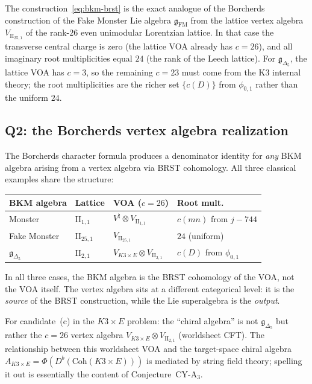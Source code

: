 \begin{remark}
\label{rem:k3e-fake-monster-comparison}
The construction~\eqref{eq:bkm-brst} is the exact analogue of the Borcherds construction of the Fake Monster Lie algebra $\mathfrak{g}_{\mathrm{FM}}$ from the lattice vertex algebra $V_{\mathrm{II}_{25,1}}$ of the rank-$26$ even unimodular Lorentzian lattice. In that case the transverse central charge is zero (the lattice VOA already has $c = 26$), and all imaginary root multiplicities equal $24$ (the rank of the Leech lattice). For $\mathfrak{g}_{\Delta_5}$, the lattice VOA has $c = 3$, so the remaining $c = 23$ must come from the K3 internal theory; the root multiplicities are the richer set $\{c(D)\}$ from $\phi_{0,1}$ rather than the uniform $24$.
\end{remark}

\subsection{Q2: the Borcherds vertex algebra realization}
\label{subsec:k3e-bkm-q2}

The Borcherds character formula produces a denominator identity for \emph{any} BKM algebra arising from a vertex algebra via BRST cohomology. All three classical examples share the structure:
\begin{center}
\renewcommand{\arraystretch}{1.3}
\begin{tabular}{@{}llll@{}}
\textbf{BKM algebra} & \textbf{Lattice} & \textbf{VOA ($c = 26$)} & \textbf{Root mult.} \\ \hline
Monster & $\mathrm{II}_{1,1}$ & $V^\natural \otimes V_{\mathrm{II}_{1,1}}$ & $c(mn)$ from $j - 744$ \\
Fake Monster & $\mathrm{II}_{25,1}$ & $V_{\mathrm{II}_{25,1}}$ & $24$ (uniform) \\
$\mathfrak{g}_{\Delta_5}$ & $\mathrm{II}_{2,1}$ & $V_{K3 \times E} \otimes V_{\mathrm{II}_{2,1}}$ & $c(D)$ from $\phi_{0,1}$
\end{tabular}
\end{center}
In all three cases, the BKM algebra is the BRST cohomology of the VOA, not the VOA itself. The vertex algebra sits at a different categorical level: it is the \emph{source} of the BRST construction, while the Lie superalgebra is the \emph{output}.

For candidate~(c) in the $K3 \times E$ problem: the ``chiral algebra'' is not $\mathfrak{g}_{\Delta_5}$ but rather the $c = 26$ vertex algebra $V_{K3 \times E} \otimes V_{\mathrm{II}_{2,1}}$ (worldsheet CFT). The relationship between this worldsheet VOA and the target-space chiral algebra $A_{K3 \times E} = \Phi(D^b(\mathrm{Coh}(K3 \times E)))$ is mediated by string field theory; spelling it out is essentially the content of Conjecture~CY-A$_3$.

